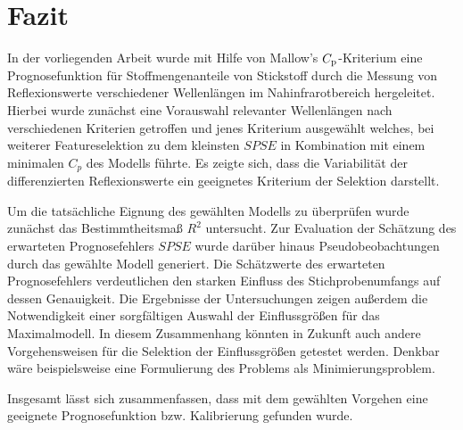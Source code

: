 \section{Fazit}
\label{sec:Fazit}

    In der vorliegenden Arbeit wurde mit Hilfe von Mallow's $C_{\mathrm{p}}$-Kriterium eine Prognosefunktion für Stoffmengenanteile von Stickstoff durch die Messung von Reflexionswerte verschiedener Wellenlängen im Nahinfrarotbereich hergeleitet.
    Hierbei wurde zunächst eine Vorauswahl relevanter Wellenlängen nach verschiedenen Kriterien getroffen und jenes Kriterium ausgewählt welches, bei weiterer Featureselektion zu dem kleinsten $SPSE$ in Kombination mit einem minimalen $C_{p}$ des Modells führte.
    Es zeigte sich, dass die Variabilität der differenzierten Reflexionswerte ein geeignetes Kriterium der Selektion darstellt.
    
    Um die tatsächliche Eignung des gewählten Modells zu überprüfen wurde zunächst das Bestimmtheitsmaß $R^2$ untersucht.
    Zur Evaluation der Schätzung des erwarteten Prognosefehlers $SPSE$ wurde darüber hinaus Pseudobeobachtungen durch das gewählte Modell generiert.
    Die Schätzwerte des erwarteten Prognosefehlers verdeutlichen den starken Einfluss des Stichprobenumfangs auf dessen Genauigkeit.
    Die Ergebnisse der Untersuchungen zeigen außerdem die Notwendigkeit einer sorgfältigen Auswahl der Einflussgrößen für das Maximalmodell.
    In diesem Zusammenhang könnten in Zukunft auch andere Vorgehensweisen für die Selektion der Einflussgrößen getestet werden.
    Denkbar wäre beispielsweise eine Formulierung des Problems als Minimierungsproblem.\cite{Menzel2016}
    
    Insgesamt lässt sich zusammenfassen, dass mit dem gewählten Vorgehen eine geeignete Prognosefunktion bzw. Kalibrierung gefunden wurde.
    
